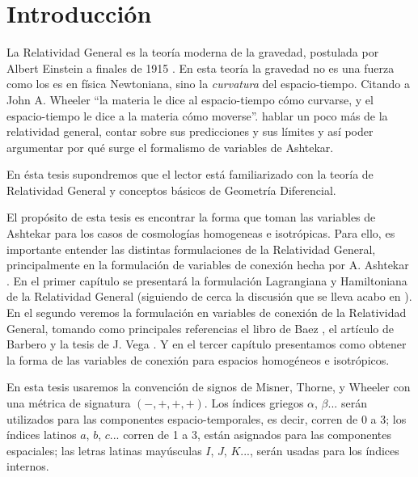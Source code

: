 \documentclass[10pt, letterpaper, spanish]{book}
\theoremstyle{definition}
\theoremstyle{plain}
\theoremstyle{remark}
\theoremstyle{break}
\begin{document}
\printnomenclature
\tableofcontents{}




\chapter*{Introducci\'{o}n}

La Relatividad General es la teor\'{i}a moderna de la gravedad, postulada por Albert Einstein a finales de 1915 \cite{Einstein}. En esta teor\'{i}a la gravedad no es una fuerza como los es en f\'{i}sica Newtoniana, sino la \emph{curvatura} del espacio-tiempo. Citando a John A. Wheeler ``la materia le dice al espacio-tiempo c\'{o}mo curvarse, y el espacio-tiempo le dice a la materia c\'{o}mo moverse''. {\color{OliveGreen} hablar un poco m\'{a}s de la relatividad general, contar sobre sus predicciones y sus l\'{i}mites y as\'{i} poder argumentar por qu\'{e} surge el formalismo de variables de Ashtekar.}

En \'{e}sta tesis supondremos que el lector est\'{a} familiarizado con la teor\'{i}a de Relatividad General y conceptos b\'{a}sicos de Geometr\'{i}a Diferencial.

El prop\'{o}sito de esta tesis es encontrar la forma que toman las variables de Ashtekar para los casos de cosmolog\'{i}as homogeneas e isotr\'{o}picas. Para ello, es importante entender las distintas formulaciones de la Relatividad General, principalmente en la formulaci\'{o}n de variables de conexi\'{o}n hecha por A. Ashtekar \cite{Ashtekar86, Ashtekar87}. En el primer cap\'{i}tulo se presentar\'{a} la formulaci\'{o}n Lagrangiana y Hamiltoniana de la Relatividad General (siguiendo de cerca la discusi\'{o}n que se lleva acabo en \cite{Poisson}). En el segundo veremos la formulaci\'{o}n en variables de conexi\'{o}n de la Relatividad General, tomando como principales referencias el libro de Baez \cite{Baez}, el art\'{i}culo de Barbero \cite{Barbero} y la tesis de J. Vega \cite{Vega}. Y en el tercer capítulo presentamos como obtener la forma de las variables de conexi\'{o}n para espacios homog\'{e}neos e isotr\'{o}picos.

En esta tesis usaremos la convenci\'{o}n de signos de Misner, Thorne, y Wheeler con una m\'{e}trica de signatura $(-,+,+,+)$. Los \'{i}ndices griegos $\alpha$, $\beta...$ ser\'{a}n utilizados para las componentes espacio-temporales, es decir, corren de 0 a 3; los \'{i}ndices latinos $a$, $b$, $c...$ corren de 1 a 3, est\'{a}n asignados para las componentes espaciales; las letras latinas may\'{u}sculas $I$, $J$, $K$..., ser\'{a}n usadas para los \'{i}ndices internos.
\end{document}
